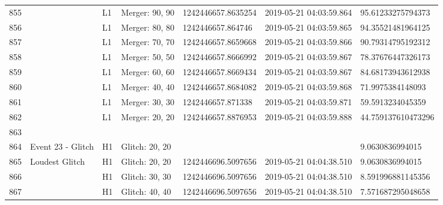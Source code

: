 \begin{longtable}{lllllll}
855  &                                                    &       L1 &    Merger: 90, 90 &  1242446657.8635254 &  2019-05-21 04:03:59.864 &   95.61233275794373 \\
856  &                                                    &       L1 &    Merger: 80, 80 &   1242446657.864746 &  2019-05-21 04:03:59.865 &   94.35521481964125 \\
857  &                                                    &       L1 &    Merger: 70, 70 &  1242446657.8659668 &  2019-05-21 04:03:59.866 &   90.79314795192312 \\
858  &                                                    &       L1 &    Merger: 50, 50 &  1242446657.8666992 &  2019-05-21 04:03:59.867 &   78.37676447326173 \\
859  &                                                    &       L1 &    Merger: 60, 60 &  1242446657.8669434 &  2019-05-21 04:03:59.867 &   84.68173943612938 \\
860  &                                                    &       L1 &    Merger: 40, 40 &  1242446657.8684082 &  2019-05-21 04:03:59.868 &    71.9975384148093 \\
861  &                                                    &       L1 &    Merger: 30, 30 &   1242446657.871338 &  2019-05-21 04:03:59.871 &    59.5913234045359 \\
862  &                                                    &       L1 &    Merger: 20, 20 &  1242446657.8876953 &  2019-05-21 04:03:59.888 &  44.759137610473296 \\
863  &                                                    &          &                   &                     &                          &                     \\
864  &                                  Event 23 - Glitch &       H1 &    Glitch: 20, 20 &                     &                          &     9.0630836994015 \\
865  &                                     Loudest Glitch &       H1 &    Glitch: 20, 20 &  1242446696.5097656 &  2019-05-21 04:04:38.510 &     9.0630836994015 \\
866  &                                                    &       H1 &    Glitch: 30, 30 &  1242446696.5097656 &  2019-05-21 04:04:38.510 &   8.591996881145356 \\
867  &                                                    &       H1 &    Glitch: 40, 40 &  1242446696.5097656 &  2019-05-21 04:04:38.510 &   7.571687295048658 \\

\end{longtable}

